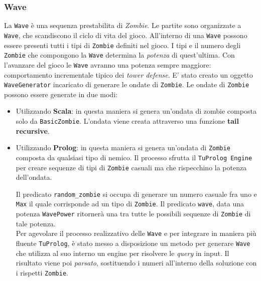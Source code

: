 \subsubsection{Wave}
La \texttt{Wave} è una sequenza prestabilita di \textit{Zombie}. Le partite sono organizzate a \texttt{Wave}, che scandiscono il ciclo di vita del gioco. All'interno di una \texttt{Wave} possono essere presenti tutti i tipi di \texttt{Zombie} definiti nel gioco. I tipi e il numero degli \texttt{Zombie} che compongono la \texttt{Wave} determina la \textit{potenza} di quest'ultima. Con l'avanzare del gioco le \texttt{Wave} avranno una potenza sempre maggiore: comportamento incrementale tipico dei \textit{tower defense}. E' stato creato un oggetto \texttt{WaveGenerator} incaricato di generare le ondate di \texttt{Zombie}. Le ondate di \texttt{Zombie} possono essere generate in due modi:
\begin{itemize}
    \item Utilizzando \textbf{Scala}: in questa maniera si genera un'ondata di zombie composta solo da \texttt{BasicZombie}. L'ondata viene creata attraverso una funzione \textbf{tail recursive}.
    
    \item Utilizzando \textbf{Prolog}: in questa maniera si genera un'ondata di \texttt{Zombie} composta da qualsiasi tipo di nemico. Il processo sfrutta il \texttt{TuProlog Engine} per creare sequenze di tipi di \texttt{Zombie} casuali ma che rispecchino la potenza dell'ondata. 
    
    Il predicato \texttt{random\_zombie} si occupa di generare un numero casuale fra uno e \texttt{Max} il quale corrisponde ad un tipo di \texttt{Zombie}. Il predicato \texttt{wave}, data una potenza \texttt{WavePower} ritornerà una tra tutte le possibili sequenze di \texttt{Zombie} di tale potenza.\\
    
    Per agevolare il processo realizzativo delle \texttt{Wave} e per integrare in maniera più fluente \texttt{TuProlog}, è stato messo a disposizione un metodo per generare \texttt{Wave} che utilizza al suo interno un engine per risolvere le \textit{query} in input. Il risultato viene poi \textit{parsato}, sostituendo i numeri all'interno della soluzione con i rispetti \texttt{Zombie}.
    
\end{itemize}